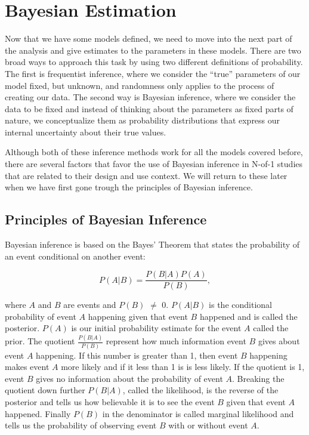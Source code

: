 \documentclass[12pt,a4paper,leqno]{report}
\theoremstyle{plain}
\theoremstyle{definition}
\theoremstyle{remark}
\begin{document}
\chapter{Bayesian Estimation}\label{bayes}

Now that we have some models defined, we need to move into the next part of the
analysis and give estimates to the parameters in these models. There
are two broad ways to approach this task by using two different definitions of
probability. The first is frequentist inference, where we consider the ``true''
parameters of our model fixed, but unknown, and randomness only applies to the
process of creating our data. The second way is Bayesian inference, where we
consider the data to be fixed and instead of thinking about the parameters as
fixed parts of nature, we conceptualize them as probability distributions that
express our internal uncertainty about their true values.

Although both of these inference methods work for all the models covered before,
there are several factors that favor the use of Bayesian inference in N-of-1
studies that are related to their design and use context. We will return to these
later when we have first gone trough the principles of Bayesian inference.

\section{Principles of Bayesian Inference}\label{whybayes}

Bayesian inference is based on the Bayes' Theorem that states the probability of
an event conditional on another event:

\begin{def}\label{}
    \begin{equation}\label{bayesrule}
        P(A|B) = \frac{P(B|A)P(A)}{P(B)},
    \end{equation}
\end{def}where \(A\) and \(B\) are events and \(P(B)\) \(\neq \) 0. \(P(A|B)\) is the conditional probability of event \(A\) happening given that
event \(B\) happened and is called the posterior. \(P(A)\) is our initial
probability estimate for the event \(A\) called the prior. The quotient
\(\frac{P(B|A)}{P(B)}\) represent how much information event \(B\) gives about
event \(A\) happening. If this number is greater than 1, then event \(B\)
happening makes event \(A\) more likely and if it less than 1 is is less likely.
If the quotient is 1, event \(B\) gives no information about the probability of
event \(A\). Breaking the quotient down further \(P(B|A)\), called the likelihood, is the reverse of the posterior and tells us how believable it is to
see the event \(B\) given that event \(A\) happened. Finally \(P(B)\) in the denominator is called marginal likelihood and tells us the probability of
observing event \(B\) with or without event \(A\).
\end{document}
